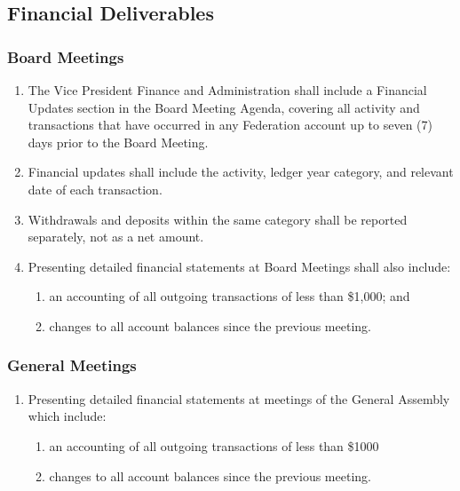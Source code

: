 \subsection{Financial Deliverables}
\label{financial-deliverables}

\subsubsection{Board Meetings}
\label{board-meetings}

\begin{enumerate}
 \item
  The Vice President Finance and Administration shall include a Financial Updates section in the Board Meeting Agenda, covering all activity and transactions that have occurred in any Federation account up to seven (7) days prior to the Board Meeting.
 \item
  Financial updates shall include the activity, ledger year category, and relevant date of each transaction.
 \item
  Withdrawals and deposits within the same category shall be reported separately, not as a net amount.
 \item
  Presenting detailed financial statements at Board Meetings shall also include:

  \begin{enumerate}
   \item
    an accounting of all outgoing transactions of less than \$1,000; and
   \item
    changes to all account balances since the previous meeting.
  \end{enumerate}
\end{enumerate}

\subsubsection{General Meetings}
\label{general-meetings}

\begin{enumerate}
 \item
  Presenting detailed financial statements at meetings of the General Assembly which include:

  \begin{enumerate}
   \item
    an accounting of all outgoing transactions of less than \$1000
   \item
    changes to all account balances since the previous meeting.
  \end{enumerate}
\end{enumerate}

